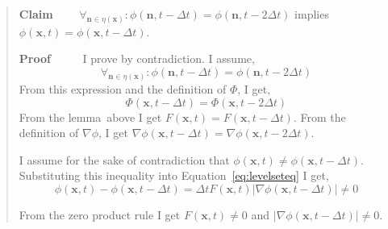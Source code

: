 \begin{quote}
\textbf{Claim} \ \ \ \ 
${\forall }_{{\mathbf n}\in \eta \left({\mathbf x}\right)}:\phi\left({\mathbf n},t-\Delta t\right)=\phi({\mathbf n},t-2\Delta t)$ implies $\phi\left({\mathbf x},t\right)=\phi\left({\mathbf x},t-\Delta t\right)$.

\textbf{Proof} \ \ \ \ \
I prove by contradiction. I assume,
\begin{equation}
{\forall }_{{\mathbf n}\in \eta \left({\mathbf x}\right)}:\phi\left({\mathbf n},t-\Delta t\right)=\phi({\mathbf n},t-2\Delta t)
\end{equation}
From this expression and the definition of $\Phi$, I get,
\begin{equation}
\Phi \left({\mathbf x},t-\Delta t\right)=\Phi \left({\mathbf x},t-2\Delta t\right)
\end{equation}
From the lemma~above I get $F\left({\mathbf x},t\right)=F\left({\mathbf x},t-\Delta t\right)$. From the definition of $\nabla \phi$, I get $\nabla \phi\left({\mathbf x},t - \Delta t\right) = \nabla \phi\left({\mathbf x},t - 2 \Delta t\right)$.

\medskip

\medskip

\medskip

\medskip

I assume for the sake of contradiction that $\phi\left({\mathbf x},t\right)\ne \phi\left({\mathbf x},t-\Delta t\right)$. Substituting this inequality into Equation~\ref{eq:levelseteq} I get,
\begin{equation}
\phi\left({\mathbf x},t\right)-\phi\left({\mathbf x},t-\Delta t\right)=\Delta tF\left({\mathbf x},t\right)\left|\nabla \phi\left({\mathbf x},t-\Delta t\right)\right|\ne 0
\end{equation}

From the zero product rule I get $F\left({\mathbf x},t\right)\ne 0$ and $\left|\nabla \phi\left({\mathbf x},t-\Delta t\right)\right|\ne 0$.

\medskip


\end{quote}
